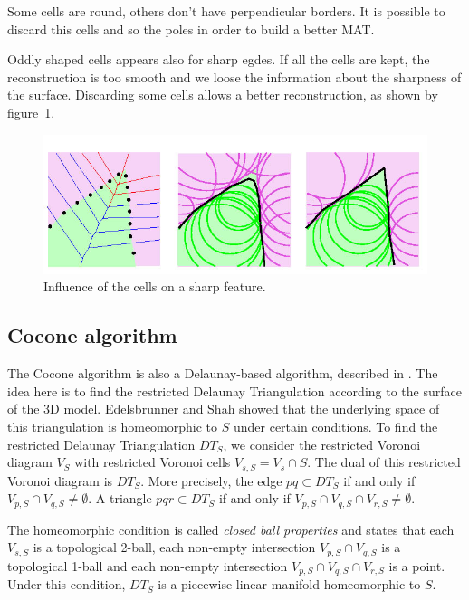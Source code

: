 \documentclass[12pt]{article}
\begin{document}
Some cells are round, others don't have perpendicular borders. It is possible to discard this cells and so the poles in order to build a better MAT. 

Oddly shaped cells appears also for sharp egdes. If all the cells are kept, the reconstruction is too smooth and we loose the information about the sharpness of the surface. Discarding some cells allows a better reconstruction, as shown by figure~\ref{sharpPC}.

\begin{figure}[h]
  \centering
  \includegraphics[scale=0.3]{sharpPC.jpg}
  \caption{\label{sharpPC} Influence of the cells on a sharp feature.}
\end{figure}

\subsection{Cocone algorithm}
The Cocone algorithm is also a Delaunay-based algorithm, described in \cite{Cocone}. The idea here is to find the restricted Delaunay Triangulation according to the surface of the 3D model. Edelsbrunner and Shah showed that the underlying space of this triangulation is homeomorphic to $S$ under certain conditions. To find the restricted Delaunay Triangulation $DT_S$, we consider the restricted Voronoi diagram $V_S$ with restricted Voronoi cells $V_{s,S} = V_s\cap S$. The dual of this restricted Voronoi diagram is $DT_S$. More precisely, the edge $pq \subset DT_S$ if and only if $V_{p,S}\cap V_{q,S} \ne \emptyset$. A triangle $pqr \subset DT_S$ if and only if $V_{p,S}\cap V_{q,S}\cap V_{r,S} \ne \emptyset$.

The homeomorphic condition is called \emph{closed ball properties} and states that each $V_{s,S}$ is a topological 2-ball, each non-empty intersection $V_{p,S}\cap V_{q,S}$ is a topological 1-ball and each non-empty intersection $V_{p,S}\cap V_{q,S}\cap V_{r,S}$ is a point. Under this condition, $DT_S$ is a piecewise linear manifold homeomorphic to $S$.
\end{document}
